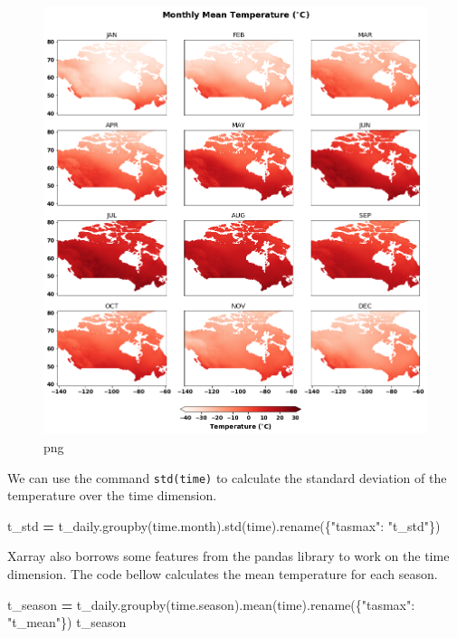 \documentclass[
]{book}
\newenvironment{Shaded}{\begin{snugshade}}{\end{snugshade}}
\newcommand{\NormalTok}[1]{#1}
\newcommand{\OperatorTok}[1]{\textcolor[rgb]{0.81,0.36,0.00}{\textbf{#1}}}
\newcommand{\StringTok}[1]{\textcolor[rgb]{0.31,0.60,0.02}{#1}}
\begin{document}
\begin{figure}
\centering
\includegraphics{output_11_0.png}
\caption{png}
\end{figure}

We can use the command \texttt{std(\textquotesingle{}time\textquotesingle{})} to calculate the standard deviation of the temperature over the time dimension.

\begin{Shaded}
\begin{Highlighting}[]
\NormalTok{t\_std }\OperatorTok{=}\NormalTok{ t\_daily.groupby(}\StringTok{\textquotesingle{}time.month\textquotesingle{}}\NormalTok{).std(}\StringTok{\textquotesingle{}time\textquotesingle{}}\NormalTok{).rename(\{}\StringTok{"tasmax"}\NormalTok{: }\StringTok{"t\_std"}\NormalTok{\})}
\end{Highlighting}
\end{Shaded}

Xarray also borrows some features from the pandas library to work on the time dimension. The code bellow calculates the mean temperature for each season.

\begin{Shaded}
\begin{Highlighting}[]
\NormalTok{t\_season }\OperatorTok{=}\NormalTok{ t\_daily.groupby(}\StringTok{\textquotesingle{}time.season\textquotesingle{}}\NormalTok{).mean(}\StringTok{\textquotesingle{}time\textquotesingle{}}\NormalTok{).rename(\{}\StringTok{"tasmax"}\NormalTok{: }\StringTok{"t\_mean"}\NormalTok{\})}
\NormalTok{t\_season}
\end{Highlighting}
\end{Shaded}
\end{document}
